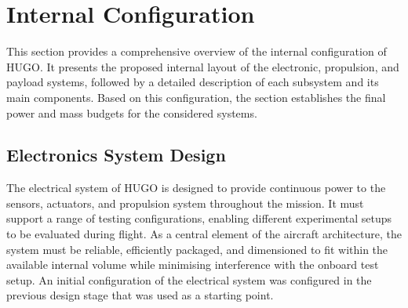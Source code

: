 
\section{Internal Configuration}
\label{sec:internal_configuration}
This section provides a comprehensive overview of the internal configuration of HUGO. It presents the proposed internal layout of the electronic, propulsion, and payload systems, followed by a detailed description of each subsystem and its main components. Based on this configuration, the section establishes the final power and mass budgets for the considered systems.


\subsection{Electronics System Design}
\label{sub:electronics_system_design}

The electrical system of HUGO is designed to provide continuous power to the sensors, actuators, and propulsion system throughout the mission. It must support a range of testing configurations, enabling different experimental setups to be evaluated during flight. As a central element of the aircraft architecture, the system must be reliable, efficiently packaged, and dimensioned to fit within the available internal volume while minimising interference with the onboard test setup. An initial configuration of the electrical system was configured in the previous design stage  that was used as a starting point. 

